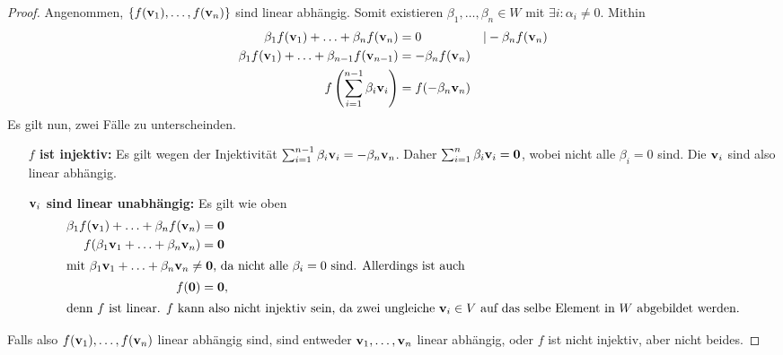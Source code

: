 \documentclass{../mfa}
\begin{document}
\begin{proof}
   Angenommen, $\{f(\mathbf{v}_{1}), \ldots, f(\mathbf{v}_{n})\}$ sind linear abhängig. Somit
   existieren $\beta_1, \ldots, \beta_n \in W$  mit $\exists i : \alpha_i \neq
   0$. Mithin
   \begin{align*}
      \beta_1 f(\mathbf{v}_{1}) + \ldots + \beta_n f(\mathbf{v}_{n}) &= 0 & | -\beta_n f(\mathbf{v}_{n})\\
      \beta_1 f(\mathbf{v}_{1}) + \ldots + \beta_{n-1} f(\mathbf{v}_{n-1}) &= -\beta_n f(\mathbf{v}_{n})\\
      f\left(\sum_{i=1}^{n-1}\beta_i \mathbf{v}_{i}\right) &=f(-\beta_n \mathbf{v}_{n})
   \end{align*}
   Es gilt nun, zwei Fälle zu unterscheinden.
   \begin{itemize}[align=left]
      \item[\bfseries $f$ ist injektiv:] Es gilt wegen der Injektivität
         $\sum_{i=1}^{n-1}\beta_i \mathbf{v}_{i} = -\beta_n \mathbf{v}_{n}$. Daher
         $\sum_{i=1}^{n}\beta_i \mathbf{v}_{i} = \mathbf{0}$, wobei nicht
         alle $\beta_i = 0$ sind. Die $\mathbf{v}_{i}$ sind also linear abhängig.
      \item[\bfseries $\mathbf{v}_{i}$ sind linear unabhängig:] Es gilt wie oben
         \begin{align*}
            \beta_1 f(\mathbf{v}_{1}) + \ldots + \beta_n f(\mathbf{v}_{n}) &= \mathbf{0} \\
            f(\beta_1 \mathbf{v}_{1} + \ldots + \beta_n \mathbf{v}_{n}) &= \mathbf{0} \\
            \intertext{mit $\beta_1 \mathbf{v}_{1} + \ldots + \beta_n \mathbf{v}_{n} \neq \mathbf{0}$, da
            nicht alle $\beta_i = 0$ sind. Allerdings ist auch}
            f(\mathbf{0}) &= \mathbf{0}, \\
            \intertext{denn $f$ ist linear. $f$ kann also nicht injektiv sein,
            da zwei ungleiche $\mathbf{v}_{i} \in V$ auf das selbe Element in $W$
         abgebildet werden.}
         \end{align*}
   \end{itemize}
   Falls also $f(\mathbf{v}_{1}), \ldots, f(\mathbf{v}_{n})$ linear abhängig sind, sind entweder
   $\mathbf{v}_{1}, \ldots, \mathbf{v}_{n}$ linear abhängig, oder $f$ ist nicht injektiv, aber
   nicht beides.
\end{proof}
\end{document}
